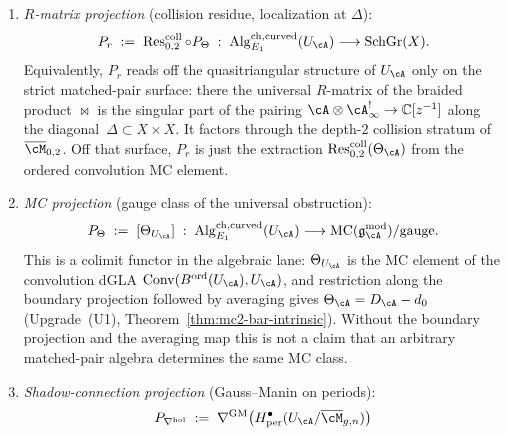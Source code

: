 \begin{theorem}
\begin{enumerate}[label=\textup{(P\arabic*)}]
\[\mathrm{End}^{\bullet}_{U_\cA\text{-}\mathrm{mod}}\bigl(P_\cA(U_\cA)\bigr)
\;\simeq\;
\mathcal C^\bullet_{\mathrm{ch}}(\cA,\cA)
\;:\;\mathrm{Alg}_{E_1}^{\mathrm{ch,curved}}(U_\cA)\longrightarrow
\mathrm{Alg}_{E_2}^{\mathrm{ch,SC}}(\cC).
\]
This is a relative limit (end) rather than a monadic quotient: it is
the derived endomorphism object of the boundary regular module
$\cA=P_\cA(U_\cA)$, and the $E_2$-structure arises from the
$\mathrm{Ass}^{\mathrm{ch}}\hookrightarrow\mathrm{SC}^{\mathrm{ch,top}}$
inclusion. It is not the absolute Hochschild centre
$\mathrm{HH}^{\bullet}_{\mathrm{ch}}(U_\cA,U_\cA)$ unless the
Morita/compact-generator comparison identifies the boundary regular
module with a generator for the same bimodule category. The restriction
map $\rho_\partial\colon P_\cC\to P_\cA$ is induced by evaluation on
the boundary unit $\mathbb C\to\cA$.
\item \emph{$R$-matrix projection} (collision residue, localization at
$\Delta$):
\[
P_r\;:=\;\operatorname{Res}^{\mathrm{coll}}_{0,2}\circ P_\Theta
\;:\;\mathrm{Alg}_{E_1}^{\mathrm{ch,curved}}(U_\cA)\longrightarrow
\mathrm{SchGr}(X).
\]
Equivalently, $P_r$ reads off the quasitriangular structure of
$U_\cA$ only on the strict matched-pair surface: there the universal
$R$-matrix of the braided product $\bowtie$ is the singular part of the pairing
$\cA\otimes\cA^!_\infty\to\mathbb C[z^{-1}]$ along the
diagonal~$\Delta\subset X\times X$. It factors through the depth-$2$
collision stratum of $\overline{\cM}_{0,2}$. Off that surface,
$P_r$ is just the extraction
$\operatorname{Res}^{\mathrm{coll}}_{0,2}(\Theta_\cA)$ from the
ordered convolution MC element.
\item \emph{MC projection} (gauge class of the universal obstruction):
\[
P_\Theta\;:=\;[\Theta_{U_\cA}]
\;:\;\mathrm{Alg}_{E_1}^{\mathrm{ch,curved}}(U_\cA)\longrightarrow
\mathrm{MC}(\mathfrak g^{\mathrm{mod}}_\cA)/\mathrm{gauge}.
\]
This is a colimit functor in the algebraic lane: $\Theta_{U_\cA}$ is
the MC element of the convolution dGLA
$\mathrm{Conv}(B^{\mathrm{ord}}(U_\cA),U_\cA)$, and restriction along
the boundary projection followed by averaging gives
$\Theta_\cA=D_\cA-d_0$ (Upgrade~(U1),
Theorem~\ref{thm:mc2-bar-intrinsic}). Without the boundary projection
and the averaging map this is not a claim that an arbitrary
matched-pair algebra determines the same MC class.
\item \emph{Shadow-connection projection} (Gauss--Manin on periods):
\[
P_{\nabla^{\mathrm{hol}}}\;:=\;
\nabla^{\mathrm{GM}}\bigl(H^\bullet_{\mathrm{per}}(U_\cA/\overline{\cM}_{g,n})\bigr)
\]
\end{enumerate}
\end{theorem}
